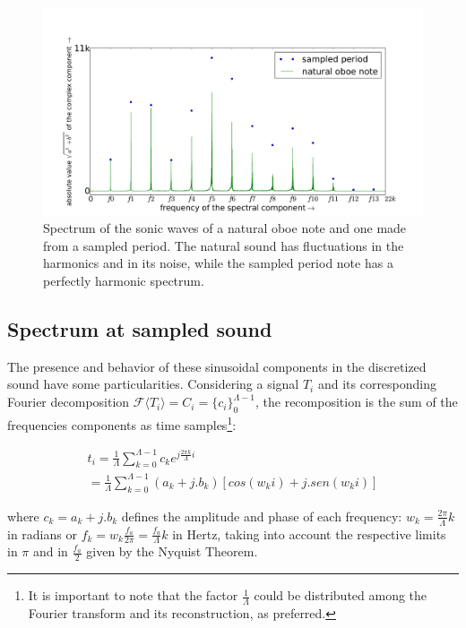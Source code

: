 \documentclass[
 aip,
 jmp,
 amsmath,amssymb,
 reprint,
]{revtex4-1}
\begin{document}
\begin{figure}
    \centering
        \includegraphics[width=\columnwidth]{figures/oboeNaturalSampledSpectrum}
    \caption{Spectrum of the sonic waves of a natural oboe note and one made from a sampled period. The natural sound has fluctuations in the harmonics and in its noise, while the sampled period note has a perfectly harmonic spectrum.}
        \label{fig:espectroOboe}
\end{figure}


\subsection{Spectrum at sampled sound}

The presence and behavior of these sinusoidal components in the discretized sound have some particularities. Considering a signal $T_i$ and its corresponding Fourier decomposition $\mathcal{F}\langle T_i\rangle=C_i=\{c_i\}_0^{\Lambda-1}$, the recomposition is the sum of the frequencies components as time samples\footnote{It is important to note that the factor $\frac{1}{\Lambda}$ could be distributed among the Fourier transform and its reconstruction, as preferred.}:

\begin{multline}\label{recomposicaoFourier}
t_i = \frac{1}{\Lambda}\sum_{k=0}^{\Lambda-1}c_ke^{j \frac{2\pi k}{\Lambda} i } \\ = \frac{1}{\Lambda}\sum_{k=0}^{\Lambda-1}(a_k+ j . b_k)\left[cos(w_k i)   +j . sen(w_k i)\right]
\end{multline}

where $c_k = a_k + j . b_k$ defines the amplitude and phase of each frequency: $w_k=\frac{2\pi}{\Lambda}k$ in radians or $f_k=w_k\frac{f_a}{2\pi}=\frac{f_a}{\Lambda}k$ in Hertz, taking into account the respective limits in $\pi$ and in $\frac{f_a}{2}$ given by the Nyquist Theorem. 
\end{document}
